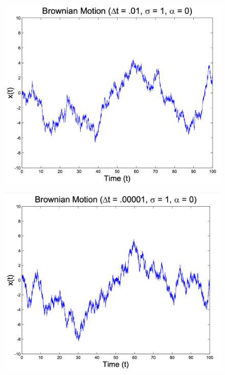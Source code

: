 \documentclass[11pt, aspectratio=169]{beamer}
\begin{document}
\begin{frame}{}
	\begin{figure}
		\includegraphics[scale=0.3]{./Brownian3}
	\end{figure}
\end{frame}


\begin{frame}{}
	\begin{figure}
		\includegraphics[scale=0.3]{./Brownian4}
	\end{figure}
\end{frame}
\end{document}
